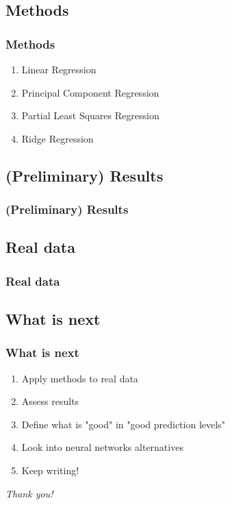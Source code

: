 \documentclass{beamer}
\begin{document}
\begin{frame}
	\section{Methods}
	\frametitle{Methods}
	
	\begin{enumerate}
		\item Linear Regression
		\item Principal Component Regression
		\item Partial Least Squares Regression
		\item Ridge Regression
	\end{enumerate}
	
\end{frame}

\begin{frame}
	\section{(Preliminary) Results}
	\frametitle{(Preliminary) Results}
\end{frame}

\begin{frame}
	\section{Real data}
	\frametitle{Real data}
\end{frame}

\begin{frame}
	\section{What is next}
	\frametitle{What is next}
	\begin{enumerate}
		\item Apply methods to real data
		\item Assess results
		\item Define what is  "good" in "good prediction levels"
		\item Look into neural networks alternatives
		\item Keep writing!
	\end{enumerate}
\end{frame}

\begin{frame}{}
	\centering \Large
	\emph{Thank you!}
\end{frame}
\end{document}

